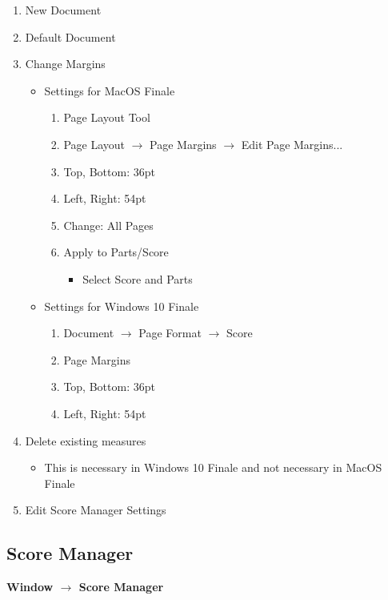 \documentclass[unicode,hyperfootnotes=false,xetex,colorlinks=true,nofonts,nobib]{tufte-handout} %
\begin{document}
\begin{enumerate}
\item New Document
\item Default Document
\item Change Margins
  \begin{itemize}
  \item Settings for MacOS Finale
    \begin{enumerate}
    \item Page Layout Tool
    \item Page Layout $\rightarrow$ Page Margins $\rightarrow$ Edit
      Page Margins...
    \item Top, Bottom: 36pt
    \item Left, Right: 54pt
    \item Change: All Pages
    \item Apply to Parts/Score
      \begin{itemize}
      \item Select Score and Parts
      \end{itemize}
    \end{enumerate}
  \end{itemize}
  \begin{itemize}
  \item Settings for Windows 10 Finale
    \begin{enumerate}
    \item Document $\rightarrow$ Page Format $\rightarrow$ Score
    \item Page Margins
    \item Top, Bottom: 36pt
    \item Left, Right: 54pt
    \end{enumerate}
  \end{itemize}
\item Delete existing measures
  \begin{itemize}
  \item This is necessary in Windows 10 Finale and not necessary in
    MacOS Finale
  \end{itemize}
\item Edit Score Manager Settings
\end{enumerate}

\subsection{Score Manager}
\label{sec:score-manager}

\textbf{Window $\rightarrow$ Score Manager}
\end{document}
